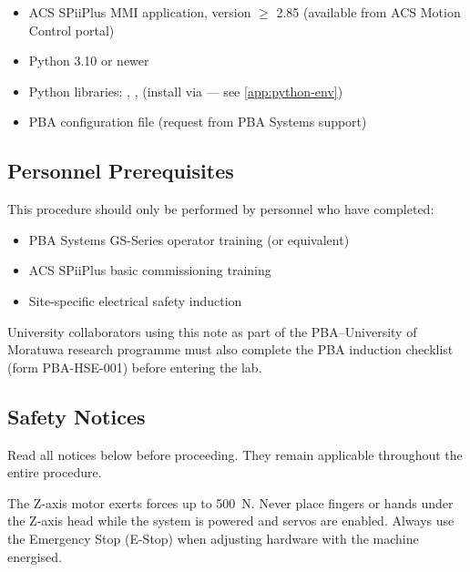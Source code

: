 \begin{itemize}[noitemsep, topsep=4pt]
  \item[$\square$] ACS SPiiPlus MMI application, version $\geq$ 2.85
                   (available from ACS Motion Control portal)
  \item[$\square$] Python 3.10 or newer
  \item[$\square$] Python libraries: , ,
                    (install via  — see
                   \cref{app:python-env})
  \item[$\square$] PBA configuration file
                    (request from
                   PBA Systems support)
\end{itemize}


\subsection{Personnel Prerequisites}
\label{sec:safety:personnel}

This procedure should only be performed by personnel who have completed:

\begin{itemize}[noitemsep]
  \item PBA Systems GS-Series operator training (or equivalent)
  \item ACS SPiiPlus basic commissioning training
  \item Site-specific electrical safety induction
\end{itemize}

\begin{tipbox}
  University collaborators using this note as part of the PBA–University of
  Moratuwa research programme must also complete the PBA induction checklist
  (form PBA-HSE-001) before entering the lab.
\end{tipbox}


\subsection{Safety Notices}
\label{sec:safety:notices}

Read all notices below before proceeding. They remain applicable throughout
the entire procedure.

\bigskip

\begin{dangerbox}
  The Z-axis motor exerts forces up to \SI{500}{\newton}.  Never place
  fingers or hands under the Z-axis head while the system is powered and
  servos are enabled.  Always use the Emergency Stop (E-Stop) when
  adjusting hardware with the machine energised.
\end{dangerbox}

